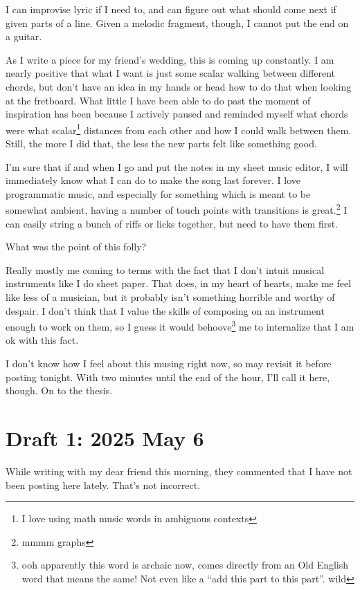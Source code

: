 \documentclass[12pt]{article}
\newcommand{\say}[1]{``#1''}
\renewcommand{\,}{\textsuperscript{,}}
\begin{document}
I can improvise lyric if I need to, and can figure out what should come next if given parts of a line.  
Given a melodic fragment, though, I cannot put the end on a guitar.

As I write a piece for my friend's wedding, this is coming up constantly.  
I am nearly positive that what I want is just some scalar walking between different chords, but don't have an idea in my hands or head how to do that when looking at the fretboard.  
What little I have been able to do past the moment of inspiration has been because I actively paused and reminded myself what chords were what scalar\footnote{I love using math music words in ambiguous contexts} distances from each other and how I could walk between them.  
Still, the more I did that, the less the new parts felt like something good.

I'm sure that if and when I go and put the notes in my sheet music editor, I will immediately know what I can do to make the song last forever.  
I love programmatic music, and especially for something which is meant to be somewhat ambient, having a number of touch points with transitions is great.\footnote{mmmm graphs}  
I can easily string a bunch of riffs or licks together, but need to have them first.

What was the point of this folly?

Really mostly me coming to terms with the fact that I don't intuit musical instruments like I do sheet paper.  
That does, in my heart of hearts, make me feel like less of a musician, but it probably isn't something horrible and worthy of despair.  
I don't think that I value the skills of composing on an instrument enough to work on them, so I guess it would behoove\footnote{ooh apparently this word is archaic now, comes directly from an Old English word that means the same! Not even like a \say{add this part to this part}. wild} me to internalize that I am ok with this fact.

I don't know how I feel about this musing right now, so may revisit it before posting tonight.  
With two minutes until the end of the hour, I'll call it here, though.  
On to the thesis.

\section{Draft 1: 2025 May 6}

While writing with my dear friend this morning, they commented that I have not been posting here lately.  
That's not incorrect.
\end{document}
